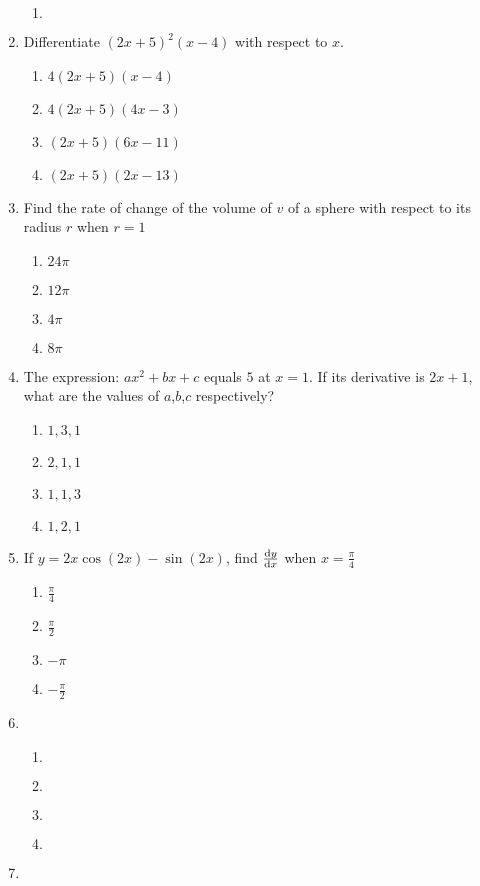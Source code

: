 \begin{multicols}{2}
\begin{enumerate}[label={\arabic*.}]
\begin{enumerate}[label={\Alph*.}]
	\item \(\)
	\end{enumerate}
\item Differentiate \((2x+5)^{2}(x-4)\) with respect to \(x\).
	\begin{enumerate}[label={\Alph*.}]
	\item \(4(2x+5)(x-4)\)
	\item \(4(2x+5)(4x-3)\)
	\item \((2x+5)(6x-11)\)
	\item \((2x+5)(2x-13)\)
	\end{enumerate}
\item Find the rate of change of the volume of \(v\) of a sphere with respect to its radius \(r\) when \(r = 1\)
	\begin{enumerate}[label={\Alph*.}]
	\item \(24\pi\)
	\item \(12\pi\)
	\item \(4\pi\)
	\item \(8\pi\)
	\end{enumerate}
\item The expression: \(ax^{2}+bx+c\) equals \(5\) at \(x = 1\). If its derivative is \(2x+1\), what are the values of \(a\),\(b\),\(c\) respectively?
	\begin{enumerate}[label={\Alph*.}]
	\item \(1, 3, 1\)
	\item \(2, 1, 1\)
	\item \(1, 1, 3\)
	\item \(1, 2, 1\)
	\end{enumerate}
\item If \(y = 2x\cos{(2x)}-\sin{(2x)}\), find \(\dv{y}{x}\) when \(x=\frac{\pi}{4}\)
	\begin{enumerate}[label={\Alph*.}]
	\item \(\frac{\pi}{4}\)
	\item \(\frac{\pi}{2}\)
	\item \(-\pi\)
	\item \(-{\frac{\pi}{2}}\)
	\end{enumerate}
\item
	\begin{enumerate}[label={\Alph*.}]
	\item \(\)
	\item \(\)
	\item \(\)
	\item \(\)
	\end{enumerate}
\item

\end{enumerate}
\end{multicols}
